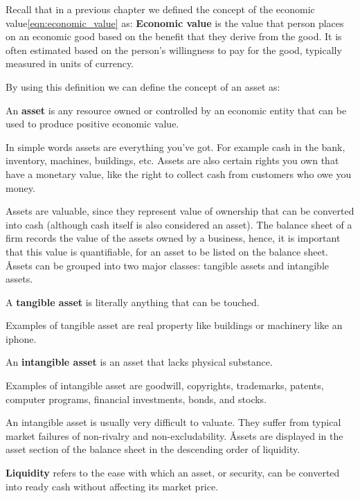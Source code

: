Recall that in a previous chapter we defined the concept of the economic value\eqref{eqn:economic_value} as:
\textbf{Economic value} is the value that person places on an economic good based on the benefit that they derive
from the good. It is often estimated based on the person's willingness to pay for the good, typically measured in
units of currency.
\ed

By using this definition we can define the concept of an asset as:

\bd[Asset]
An \textbf{asset} is any resource owned or controlled by an economic entity that can be used to produce positive
economic value.
\ed

\be
In simple words assets are everything you've got. For example cash in the bank, inventory, machines, buildings, etc.
Assets are also certain rights you own that have a monetary value, like the right to collect cash from customers who
owe you money.
\ee

Assets are valuable, since they represent value of ownership that can be converted into cash (although cash itself is
also considered an asset). The balance sheet of a firm records the value of the assets owned by a business, hence, it
is important that this value is quantifiable, for an asset to be listed on the balance sheet. \v

Assets can be grouped into two major classes: tangible assets and intangible assets.

A \textbf{tangible asset} is literally anything that can be touched.
\ed

\be
Examples of tangible asset are real property like buildings or machinery like an iphone.
\ee

An \textbf{intangible asset} is an asset that lacks physical substance.
\ed

\be
Examples of intangible asset are goodwill, copyrights, trademarks, patents, computer programs, financial investments,
bonds, and stocks.
\ee

An intangible asset is usually very difficult to valuate. They suffer from typical market failures of non-rivalry and
non-excludability. \v

Assets are displayed in the asset section of the balance sheet in the descending order of liquidity.

\bd[Liquidity]
\textbf{Liquidity} refers to the ease with which an asset, or security, can be converted into ready cash without
affecting its market price.
\ed


